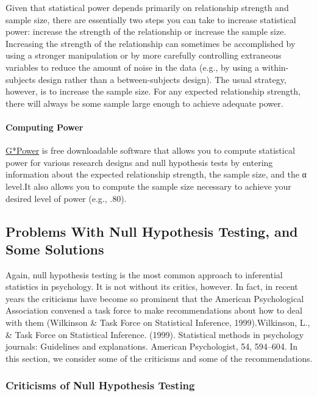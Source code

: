 \documentclass[
]{krantz}
\begin{document}
Given that statistical power depends primarily on relationship strength and sample size, there are essentially two steps you can take to increase statistical power: increase the strength of the relationship or increase the sample size. Increasing the strength of the relationship can sometimes be accomplished by using a stronger manipulation or by more carefully controlling extraneous variables to reduce the amount of noise in the data (e.g., by using a within-subjects design rather than a between-subjects design). The usual strategy, however, is to increase the sample size. For any expected relationship strength, there will always be some sample large enough to achieve adequate power.

\paragraph*{Computing Power}\label{computing-power}

\href{https://www.psychologie.hhu.de/arbeitsgruppen/allgemeine-psychologie-und-arbeitspsychologie/gpower}{G*Power} is free downloadable software that allows you to compute statistical power for various research designs and null hypothesis tests by entering information about the expected relationship strength, the sample size, and the α level.It also allows you to compute the sample size necessary to achieve your desired level of power (e.g., .80).

\subsection*{Problems With Null Hypothesis Testing, and Some Solutions}\label{problems-with-null-hypothesis-testing-and-some-solutions}


Again, null hypothesis testing is the most common approach to inferential statistics in psychology. It is not without its critics, however. In fact, in recent years the criticisms have become so prominent that the American Psychological Association convened a task force to make recommendations about how to deal with them (Wilkinson \& Task Force on Statistical Inference, 1999).Wilkinson, L., \& Task Force on Statistical Inference. (1999). Statistical methods in psychology journals: Guidelines and explanations. American Psychologist, 54, 594--604. In this section, we consider some of the criticisms and some of the recommendations.

\subsubsection*{Criticisms of Null Hypothesis Testing}\label{criticisms-of-null-hypothesis-testing}
\end{document}
